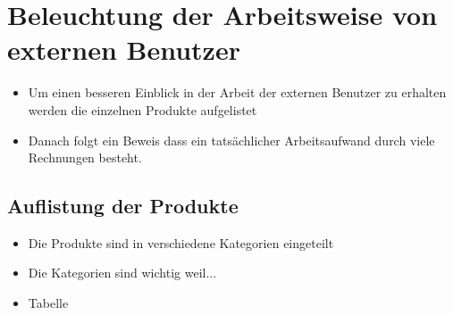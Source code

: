 \chapter{Beleuchtung der Arbeitsweise von externen Benutzer}

\begin{itemize}
	\item Um einen besseren Einblick in der Arbeit der externen Benutzer zu erhalten werden die einzelnen Produkte aufgelistet
	\item Danach folgt ein Beweis dass ein tatsächlicher Arbeitsaufwand durch viele Rechnungen besteht.
\end{itemize}

\section{Auflistung der Produkte}
\begin{itemize}
	\item Die Produkte sind in verschiedene Kategorien eingeteilt
	\item Die Kategorien sind wichtig weil...
	\item Tabelle
\end{itemize}

